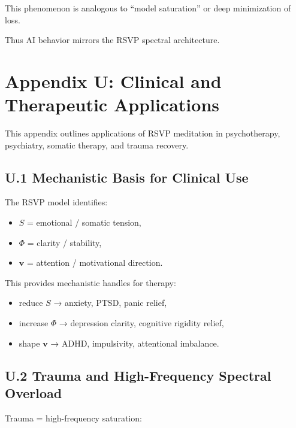 \documentclass[12pt]{article}
\begin{document}
This phenomenon is analogous to “model saturation” or deep minimization of loss.

Thus AI behavior mirrors the RSVP spectral architecture.


\section*{Appendix U: Clinical and Therapeutic Applications}

This appendix outlines applications of RSVP meditation in psychotherapy,
psychiatry, somatic therapy, and trauma recovery.

\subsection*{U.1 Mechanistic Basis for Clinical Use}

The RSVP model identifies:

\begin{itemize}
\item $S$ = emotional / somatic tension,
\item $\Phi$ = clarity / stability,
\item $\mathbf{v}$ = attention / motivational direction.
\end{itemize}

This provides mechanistic handles for therapy:

\begin{itemize}
\item reduce $S$ → anxiety, PTSD, panic relief,
\item increase $\Phi$ → depression clarity, cognitive rigidity relief,
\item shape $\mathbf{v}$ → ADHD, impulsivity, attentional imbalance.
\end{itemize}

\subsection*{U.2 Trauma and High-Frequency Spectral Overload}

Trauma = high-frequency saturation:
\end{document}
